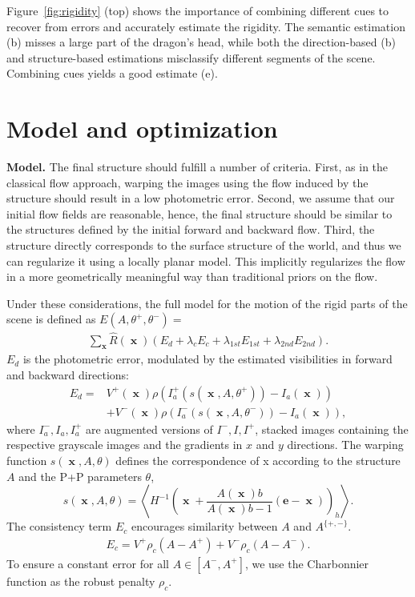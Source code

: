 \documentclass[10pt,twocolumn,letterpaper]{article}
\DeclareMathOperator{\x}{\mathbf{x}}
\begin{document}
Figure~\ref{fig:rigidity} (top) shows the importance of combining different cues to recover from errors and accurately estimate the rigidity.
The semantic estimation (b) misses a large part of the dragon's head, while both the direction-based (b) and structure-based estimations misclassify different segments of the scene.
Combining cues yields a good estimate (e). \section{Model and optimization}
\label{sec:model}
\noindent
{\bf Model.}
The final structure should fulfill a number of criteria.
First, as in the classical flow approach, warping the images using the flow induced by the structure should result in a low photometric error.
Second, we assume that our initial flow fields are reasonable, hence, the final structure should be similar to the structures defined by the initial forward and backward flow.
Third, the structure directly corresponds to the surface structure of the world, and thus we can regularize it using a locally planar model. This implicitly regularizes the flow in a more geometrically meaningful way than traditional priors on the flow.

Under these considerations, the full model for the motion of the rigid parts of the scene is defined as $E(A,\theta^+,\theta^-) =$
\begin{align}
\sum_{\x} \hat{R}(\x) \left( E_{d} + \lambda_c E_{c} + \lambda_{1st} E_{1st} + \lambda_{2nd} E_{2nd} \right).
\label{eq:energy_full}
\end{align}
$E_{d}$ is the photometric error, modulated by the estimated visibilities in forward and backward directions:
\begin{align}
E_{d} =& 
V^+(\x) \rho\left( I_a^+\left( s \left(\x, A, \theta^+ \right) \right) - I_a(\x) \right)
	\nonumber \\
&+ V^-(\x) \rho\left( I_a^-\left( s \left(\x, A, \theta^- \right) \right) - I_a(\x) \right),
\end{align}
where $I_a^-,I_a,I_a^+$ are augmented versions of $I^-,I,I^+$, \ie stacked images containing the respective grayscale images and the gradients in $x$ and $y$ directions.
The warping function $s(\x, A, \theta)$ defines the correspondence of x according to the structure $A$ and the P+P parameters $\theta$,
\begin{equation}
s(\x, A, \theta) = \left\langle H^{-1} \left( \x + \frac{A(\x)b}{A(\x)b-1}\left( \mathbf{e}-\x \right) \right)_h \right\rangle.
\end{equation}
The consistency term $E_{c}$ encourages similarity between $A$ and $A^{ \{ +,- \} }$.
\begin{align}
E_{c} = 
V^+ \rho_c \left( A - A^+ \right)
+V^- \rho_c \left( A - A^- \right) .
\end{align}
To ensure a constant error for all $A \in \left[ A^-, A^+ \right]$, we use the Charbonnier function as the robust penalty $\rho_c$.
\end{document}
